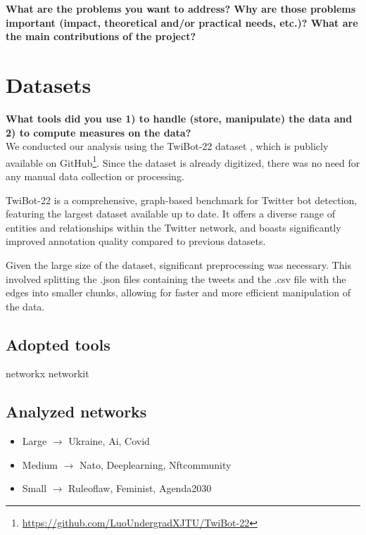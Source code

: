 \documentclass[12pt, a4paper]{article}
\begin{document}
	\textbf{What are the problems you want to address? Why are those problems important (impact, theoretical and/or practical needs, etc.)? What are the main contributions of the project?}


\section{Datasets}
	\label{datasets}

	\textbf{What tools did you use 1) to handle (store, manipulate) the data and 2) to compute measures on the data?}\\
	
	We conducted our analysis using the TwiBot-22 dataset \cite{twibot22}, which is publicly available on GitHub\footnote{\href{https://github.com/LuoUndergradXJTU/TwiBot-22}{https://github.com/LuoUndergradXJTU/TwiBot-22}}. Since the dataset is already digitized, there was no need for any manual data collection or processing.
	\vspace{0.1cm}
	
	TwiBot-22 is a comprehensive, graph-based benchmark for Twitter bot detection, featuring the largest dataset available up to date. It offers a diverse range of entities and relationships within the Twitter network, and boasts significantly improved annotation quality compared to previous datasets.
	\vspace{0.1cm}
	
	Given the large size of the dataset, significant preprocessing was necessary. This involved splitting the .json files containing the tweets and the .csv file with the edges into smaller chunks, allowing for faster and more efficient manipulation of the data.
	
	\subsection{Adopted tools}
		
		networkx networkit
		
	\subsection{Analyzed networks}
		\begin{itemize}
			\item Large $\rightarrow$ Ukraine, Ai, Covid
			\item Medium $\rightarrow$ Nato, Deeplearning, Nftcommunity
			\item Small $\rightarrow$ Ruleoflaw, Feminist, Agenda2030
		\end{itemize}
\end{document}
